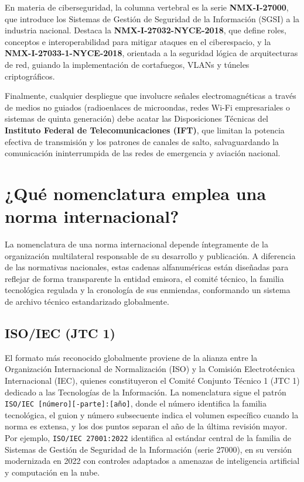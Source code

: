 \documentclass[a4paper,12pt]{article}
\begin{document}
En materia de ciberseguridad, la columna vertebral es la serie \textbf{NMX-I-27000}, que introduce los Sistemas de Gestión de Seguridad de la Información (SGSI) a la industria nacional. Destaca la \textbf{NMX-I-27032-NYCE-2018}, que define roles, conceptos e interoperabilidad para mitigar ataques en el ciberespacio, y la \textbf{NMX-I-27033-1-NYCE-2018}, orientada a la seguridad lógica de arquitecturas de red, guiando la implementación de cortafuegos, VLANs y túneles criptográficos.

Finalmente, cualquier despliegue que involucre señales electromagnéticas a través de medios no guiados (radioenlaces de microondas, redes Wi-Fi empresariales o sistemas de quinta generación) debe acatar las Disposiciones Técnicas del \textbf{Instituto Federal de Telecomunicaciones (IFT)}, que limitan la potencia efectiva de transmisión y los patrones de canales de salto, salvaguardando la comunicación ininterrumpida de las redes de emergencia y aviación nacional.

\newpage

\section{¿Qué nomenclatura emplea una norma internacional?}

La nomenclatura de una norma internacional depende íntegramente de la organización multilateral responsable de su desarrollo y publicación. A diferencia de las normativas nacionales, estas cadenas alfanuméricas están diseñadas para reflejar de forma transparente la entidad emisora, el comité técnico, la familia tecnológica regulada y la cronología de sus enmiendas, conformando un sistema de archivo técnico estandarizado globalmente.

\subsection*{ISO/IEC (JTC 1)}

El formato más reconocido globalmente proviene de la alianza entre la Organización Internacional de Normalización (ISO) y la Comisión Electrotécnica Internacional (IEC), quienes constituyeron el Comité Conjunto Técnico 1 (JTC 1) dedicado a las Tecnologías de la Información. La nomenclatura sigue el patrón \texttt{ISO/IEC [número][-parte]:[año]}, donde el número identifica la familia tecnológica, el guion y número subsecuente indica el volumen específico cuando la norma es extensa, y los dos puntos separan el año de la última revisión mayor. Por ejemplo, \texttt{ISO/IEC 27001:2022} identifica al estándar central de la familia de Sistemas de Gestión de Seguridad de la Información (serie 27000), en su versión modernizada en 2022 con controles adaptados a amenazas de inteligencia artificial y computación en la nube.
\end{document}
